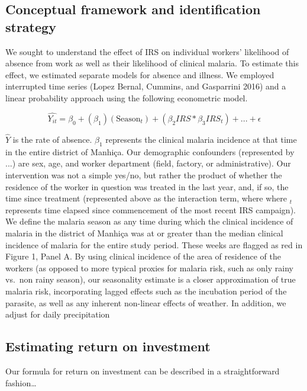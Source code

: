 \documentclass[]{article}
\begin{document}
\subsection{Conceptual framework and identification
strategy}\label{conceptual-framework-and-identification-strategy}

We sought to understand the effect of IRS on individual workers'
likelihood of absence from work as well as their likelihood of clinical
malaria. To estimate this effect, we estimated separate models for
absence and illness. We employed interrupted time series (Lopez Bernal,
Cummins, and Gasparrini 2016) and a linear probability approach using
the following econometric model.

\[
\hat{Y_{it}} = \beta_{0} +  (\beta_{1}) (\text{Season}_{t}) + (\beta_2{IRS}*\beta_3{IRS_t}) + ... + \epsilon
\]

\(\hat{Y}\) is the rate of absence. \(\beta_{1}\) represents the
clinical malaria incidence at that time in the entire district of
Manhiça. Our demographic confounders (represented by \(...\)) are sex,
age, and worker department (field, factory, or administrative). Our
intervention was not a simple yes/no, but rather the product of whether
the residence of the worker in question was treated in the last year,
and, if so, the time since treatment (represented above as the
interaction term, where where \(_t\) represents time elapsed since
commencement of the most recent IRS campaign). We define the malaria
season as any time during which the clinical incidence of malaria in the
district of Manhiça was at or greater than the median clinical incidence
of malaria for the entire study period. These weeks are flagged as red
in Figure 1, Panel A. By using clinical incidence of the area of
residence of the workers (as opposed to more typical proxies for malaria
risk, such as only rainy vs.~non rainy season), our seasonality estimate
is a closer approximation of true malaria risk, incorporating lagged
effects such as the incubation period of the parasite, as well as any
inherent non-linear effects of weather. In addition, we adjust for daily
precipitation

\subsection{Estimating return on
investment}\label{estimating-return-on-investment}

Our formula for return on investment can be described in a
straightforward fashion\ldots{}
\end{document}
